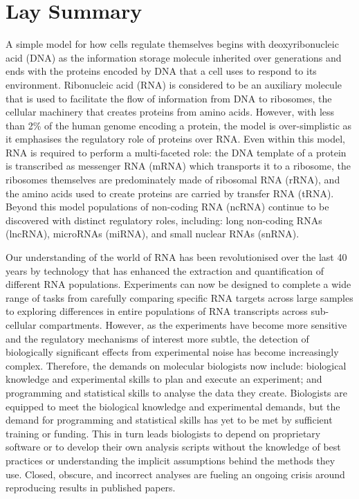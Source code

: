 \documentclass[../main.tex]{subfiles}
\begin{document}
\chapter{Lay Summary}
\onehalfspacing

A simple model for how cells regulate themselves begins with deoxyribonucleic acid (DNA) as the information storage molecule inherited over generations and ends with the proteins encoded by DNA that a cell uses to respond to its environment.
Ribonucleic acid (RNA) is considered to be an auxiliary molecule that is used to facilitate the flow of information from DNA to ribosomes, the cellular machinery that creates proteins from amino acids.
However, with less than 2\% of the human genome encoding a protein, the model is over-simplistic as it emphasises the regulatory role of proteins over RNA.
Even within this model, RNA is required to perform a multi-faceted role: the DNA template of a protein is transcribed as messenger RNA (mRNA) which transports it to a ribosome, the ribosomes themselves are predominately made of ribosomal RNA (rRNA), and the amino acids used to create proteins are carried by transfer RNA (tRNA).
Beyond this model populations of non-coding RNA (ncRNA) continue to be discovered with distinct regulatory roles, including: long non-coding RNAs (lncRNA), microRNAs (miRNA), and small nuclear RNAs (snRNA).

Our understanding of the world of RNA has been revolutionised over the last 40 years by technology that has enhanced the extraction and quantification of different RNA populations.
Experiments can now be designed to complete a wide range of tasks from carefully comparing specific RNA targets across large samples to exploring differences in entire populations of RNA transcripts across sub-cellular compartments. 
However, as the experiments have become more sensitive and the regulatory mechanisms of interest more subtle, the detection of biologically significant effects from experimental noise has become increasingly complex.
Therefore, the demands on molecular biologists now include: biological knowledge and experimental skills to plan and execute an experiment; and programming and statistical skills to analyse the data they create.
Biologists are equipped to meet the biological knowledge and experimental demands, but the demand for programming and statistical skills has yet to be met by sufficient training or funding.
This in turn leads biologists to depend on proprietary software or to develop their own analysis scripts without the knowledge of best practices or understanding the implicit assumptions behind the methods they use.
Closed, obscure, and incorrect analyses are fueling an ongoing crisis around reproducing results in published papers.
\end{document}
